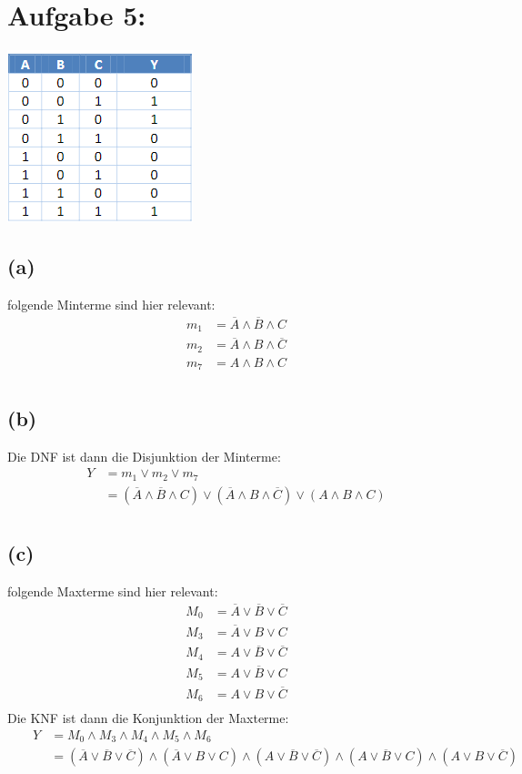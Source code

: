 \documentclass[]{article}
\newcommand{\V}{\lor}
\newcommand{\A}{\land}
\newcommand{\T}[1]{\overline{#1}}
\begin{document}
\section*{Aufgabe 5:}
\begin{center}\includegraphics[scale=0.7]{Bilder/5.png}\end{center}
\subsection*{(a)}
	folgende Minterme sind hier relevant:
	\begin{align*}
		&& m_1 &= \T{A} \A \T{B} \A C &&\\
		&& m_2 &= \T{A} \A B \A \T{C} &&\\
		&& m_7 &= A \A B \A C &&\\
	\end{align*}
\subsection*{(b)}
	Die DNF ist dann die Disjunktion der Minterme:
	\begin{align*}
		&& Y &= m_1 \V m_2 \V m_7 &&\\
		&& &= (\T{A} \A \T{B} \A C) \V (\T{A} \A B \A \T{C}) \V (A \A B \A C) &&\\
	\end{align*}
\subsection*{(c)}
	folgende Maxterme sind hier relevant:
	\begin{align*}
		&& M_0 &= \T{A} \V \T{B} \V \T{C} &&\\
		&& M_3 &= \T{A} \V B \V C &&\\
		&& M_4 &= A \V  \T{B} \V \T{C} &&\\
		&& M_5 &= A \V \T{B} \V C &&\\
		&& M_6 &= A \V B \V \T{C} &&\\
	\end{align*}
	Die KNF ist dann die Konjunktion der Maxterme:
	\begin{align*}
		&& Y &= M_0 \A M_3 \A M_4 \A M_5 \A M_6 &&\\
		&& &= (\T{A} \V \T{B} \V \T{C}) \A (\T{A} \V B \V C) \A (A \V  \T{B} \V \T{C}) \A (A \V \T{B} \V C) \A (A \V B \V \T{C}) &&\\
	\end{align*}
\end{document}
